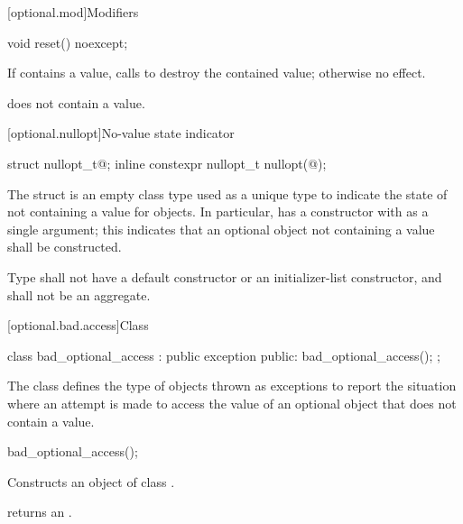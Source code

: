 [optional.mod]{Modifiers}

%
\begin{itemdecl}
void reset() noexcept;
\end{itemdecl}

\begin{itemdescr}
\pnum
\effects
If  contains a value, calls  to destroy the contained value;
otherwise no effect.

\pnum
\ensures
{} does not contain a value.
\end{itemdescr}

[optional.nullopt]{No-value state indicator}

%
%
\begin{itemdecl}
struct nullopt_t{@\seebelow@};
inline constexpr nullopt_t nullopt(@\unspec@);
\end{itemdecl}

\pnum
The struct  is an empty class type used as a unique type to indicate the state of not containing a value for  objects.
In particular,  has a constructor with  as a single argument;
this indicates that an optional object not containing a value shall be constructed.

\pnum
Type  shall not have a default constructor or an initializer-list constructor, and shall not be an aggregate.

[optional.bad.access]{Class }

\begin{codeblock}
class bad_optional_access : public exception {
public:
  bad_optional_access();
};
\end{codeblock}

\pnum
The class  defines the type of objects thrown as exceptions to report the situation where an attempt is made to access the value of an optional object that does not contain a value.

%
%
\begin{itemdecl}
bad_optional_access();
\end{itemdecl}

\begin{itemdescr}
\pnum
\effects
Constructs an object of class .

\pnum
\ensures
{} returns an
\ntbs{}.
\end{itemdescr}

